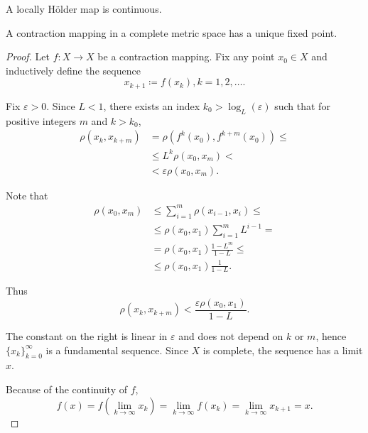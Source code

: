 \begin{corollary}\label{thm:locally_holder_map_is_continuous}
  A locally H\"older map is continuous.
\end{corollary}

\begin{theorem}\label{thm:banach_fixed_point_theorem}\cite[exercise 4.3.J]{Engelking1989}
  A contraction mapping in a complete metric space has a unique fixed point.
\end{theorem}
\begin{proof}
  Let \( f: X \to X \) be a contraction mapping. Fix any point \( x_0 \in X \) and inductively define the sequence
  \begin{equation*}
    x_{k+1} \coloneqq f(x_k), k = 1, 2, \ldots.
  \end{equation*}

  Fix \( \varepsilon > 0 \). Since \( L < 1 \), there exists an index \( k_0 > \log_L(\varepsilon) \) such that for positive integers \( m \) and \( k > k_0 \),
  \begin{align*}
    \rho(x_k, x_{k+m})
    &=
    \rho(f^k(x_0), f^{k+m}(x_0))
    \leq \\ &\leq
    L^k \rho(x_0, x_m)
    < \\ &<
    \varepsilon \rho(x_0, x_m).
  \end{align*}

  Note that
  \begin{align*}
    \rho(x_0, x_m)
    &\leq
    \sum_{i=1}^m \rho(x_{i-1}, x_i)
    \leq \\ &\leq
    \rho(x_0, x_1) \sum_{i=1}^m L^{i-1}
    = \\ &=
    \rho(x_0, x_1) \frac {1 - L^m} {1 - L}
    \leq \\ &\leq
    \rho(x_0, x_1) \frac 1 {1 - L}.
  \end{align*}

  Thus
  \begin{equation*}
    \rho(x_k, x_{k+m}) < \frac {\varepsilon \rho(x_0, x_1)} {1 - L}.
  \end{equation*}

  The constant on the right is linear in \( \varepsilon \) and does not depend on \( k \) or \( m \), hence \( \{ x_k \}_{k=0}^\infty \) is a fundamental sequence. Since \( X \) is complete, the sequence has a limit \( x \).

  Because of the continuity of \( f \),
  \begin{equation*}
    f(x) = f(\lim_{k \to \infty} x_k) = \lim_{k \to \infty} f(x_k) = \lim_{k \to \infty} x_{k+1} = x.
  \end{equation*}
\end{proof}
